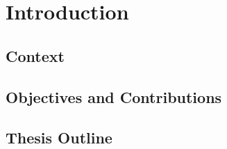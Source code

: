 
\chapter{\label{ch:1-intro}Introduction} 

\minitoc

\section{Context}

\section{Objectives and Contributions}

\section{Thesis Outline}